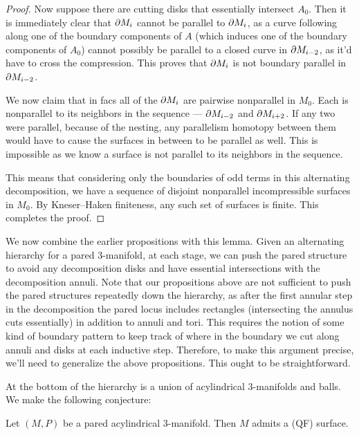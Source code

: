 \begin{proof}
Now suppose there are cutting disks that essentially intersect $A_0$. Then it
is immediately clear that $\partial M_i$ cannot be parallel to $\partial M_i$, as a curve
following along one of the boundary components of $A$ (which induces one of the
boundary components of $A_0$) cannot possibly be parallel to a closed curve in
$\partial M_{i-2}$, as it'd have to cross the compression. This proves that $\partial
M_i$ is not boundary parallel in $\partial M_{i-2}$.

We now claim that in facs all of the $\partial M_i$ are pairwise nonparallel in
$M_0$.  Each is nonparallel to its neighbors in the sequence --- $\partial M_{i-2}$
and $\partial M_{i+2}$.  If any two were parallel, because of the nesting, any
parallelism homotopy between them would have to cause the surfaces in between
to be parallel as well. This is impossible as we know a surface is not parallel
to its neighbors in the sequence.

This means that considering only the boundaries of odd terms in this
alternating decomposition, we have a sequence of disjoint nonparallel
incompressible surfaces in $M_0$. By Kneser--Haken finiteness, any such set of
surfaces is finite. This completes the proof.

\end{proof}

We now combine the earlier propositions with this lemma. Given an alternating
hierarchy for a pared $3$-manifold, at each stage, we can push the pared
structure to avoid any decomposition disks and have essential intersections
with the decomposition annuli. Note that our propositions above are not
sufficient to push the pared structures repeatedly down the hierarchy, as after
the first annular step in the decomposition the pared locus includes rectangles
(intersecting the annulus cuts essentially) in addition to annuli and tori.
This requires the notion of some kind of boundary pattern to keep track of
where in the boundary we cut along annuli and disks at each inductive step.
Therefore, to make this argument precise, we'll need to generalize the above
propositions. This ought to be straightforward.

At the bottom of the hierarchy is a union of acylindrical $3$-manifolds and
balls. We make the following conjecture:

\begin{conj}

Let $(M,P)$ be a pared acylindrical $3$-manifold. Then $M$ admits a (QF)
surface.

\end{conj}

